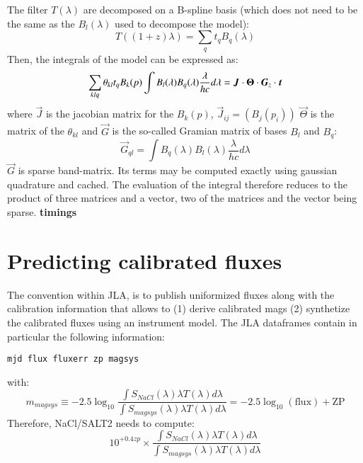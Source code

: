 \documentclass{aa}
\begin{document}
The filter $T(\lambda)$ are decomposed on a B-spline basis (which does
not need to be the same as the $B_l(\lambda)$ used to decompose the
model):
\begin{equation}
  T((1+z)\lambda) = \sum_q t_q B_q(\lambda)
\end{equation}
Then, the integrals of the model can be expressed as:
\begin{equation}
    \sum_{klq} \theta_{kl} t_q B_k(p) \int B_l(\lambda) B_q(\lambda) \frac{\lambda}{hc} d\lambda = \vec{J} \cdot \vec{\Theta} \cdot \vec{G}_z  \cdot \vec{t}\\
\end{equation}
where $\vec{J}$ is the jacobian matrix for the $B_k(p)$, $\vec{J}_{ij}
= (B_j(p_i))$ $\vec{\Theta}$ is the matrix of the $\theta_{kl}$ and
$\vec{G}$ is the so-called Gramian matrix of bases $B_l$ and $B_q$:
\begin{equation}
  \vec{G}_{ql} = \int B_q(\lambda) B_l(\lambda) \frac{\lambda}{hc} d\lambda
\end{equation}
$\vec{G}$ is sparse band-matrix.  Its terms may be computed exactly
using gaussian quadrature and cached.  The evaluation of the integral
therefore reduces to the product of three matrices and a vector, two
of the matrices and the vector being sparse.
{\bf timings}

\section{Predicting calibrated fluxes}

The convention within JLA, is to publish uniformized fluxes along with the
calibration information that allows to (1) derive calibrated mags (2) synthetize
the calibrated fluxes using an instrument model. The JLA dataframes contain in
particular the following information:
\begin{verbatim}
mjd flux fluxerr zp magsys
\end{verbatim}
with:
\begin{equation}
  m_{magsys} \equiv -2.5 \log_{10}\frac{\int S_{NaCl}(\lambda) \lambda T(\lambda) d\lambda}{\int S_{magsys}(\lambda)\lambda T(\lambda) d\lambda} = -2.5 \log_{10} (\mathrm{flux}) + \mathrm{ZP}
\end{equation}
Therefore, NaCl/SALT2 needs to compute:
\begin{equation}
  10^{+0.4 zp} \times \frac{\int S_{NaCl}(\lambda) \lambda T(\lambda) d\lambda}{\int S_{magsys}(\lambda)\lambda T(\lambda) d\lambda}
\end{equation}
\end{document}

